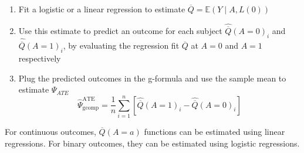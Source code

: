 \documentclass[
]{book}
\begin{document}
\begin{enumerate}
\def\labelenumi{\arabic{enumi}.}
\item
  Fit a logistic or a linear regression to estimate \(\overline{Q} = \mathbb{E}(Y \mid A, L(0))\)
\item
  Use this estimate to predict an outcome for each subject \(\hat{\overline{Q}}(A=0)_i\) and \(\hat{\overline{Q}}(A=1)_i\), by evaluating the regression fit \(\overline{Q}\) at \(A=0\) and \(A=1\) respectively
\item
  Plug the predicted outcomes in the g-formula and use the sample mean to estimate \(\Psi_{ATE}\)
  \begin{equation}
  \hat{\Psi}^{\text{ATE}}_{\text{gcomp}} = \frac{1}{n} \sum_{i=1}^n \left[ \hat{\overline{Q}}(A=1)_i - \hat{\overline{Q}}(A=0)_i \right]
  \end{equation}
\end{enumerate}

For continuous outcomes, \(\overline{Q}(A=a)\) functions can be estimated using linear regressions. For binary outcomes, they can be estimated using logistic regressions.
\end{document}
